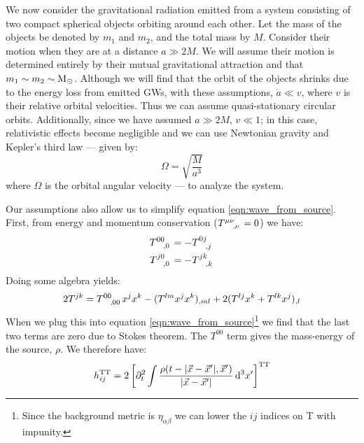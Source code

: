 We now consider the gravitational radiation emitted from a system consisting of two compact spherical objects orbiting around each other. Let the mass of the objects be denoted by $m_1$ and $m_2$, and the total mass by $M$. Consider their motion when they are at a distance $a \gg 2M$. We will assume their motion is determined entirely by their mutual gravitational attraction and that $m_1 \sim m_2 \sim \mathrm{M_\odot}$. Although we will find that the orbit of the objects shrinks due to the energy loss from emitted \acp{GW}, with these assumptions, $\dot{a} \ll v$, where $v$ is their relative orbital velocities. Thus we can assume quasi-stationary circular orbits. Additionally, since we have assumed $a \gg 2M$, $v \ll 1$; in this case, relativistic effects become negligible and we can use Newtonian gravity and Kepler's third law --- given by: 
\begin{equation}
\label{eqn:orbit_ang_v}
\Omega = \sqrt{\frac{M}{a^3}}
\end{equation}
where $\Omega$ is the orbital angular velocity --- to analyze the system.

Our assumptions also allow us to simplify equation \ref{eqn:wave_from_source}. First, from energy and momentum conservation ($T\indices{^{\mu\nu}_{,\nu}} = 0$) we have:
\begin{align*}
T\indices{^{00}_{,0}} &= -T\indices{^{0j}_{,j}} \\
T\indices{^{j0}_{,0}} &= -T\indices{^{jk}_{,k}}
\end{align*}
Doing some algebra yields:
\begin{equation*}
2T^{jk} = T\indices{^{00}_{,00}}x^jx^k - (T^{lm}x^jx^k)_{,ml} + 2(T^{lj}x^k + T^{lk}x^j)_{,l}
\end{equation*}
When we plug this into equation \ref{eqn:wave_from_source}\footnote{Since the background metric is $\eta_{\alpha\beta}$ we can lower the $ij$ indices on T with impunity.} we find that the last two terms are zero due to Stokes theorem. The $T^{00}$ term gives the mass-energy of the source, $\rho$. We therefore have:
\begin{equation}
\label{eqn:source_rho}
h^\TT_{ij} = 2 \left[ \partial_t^2 \int \frac{\rho(t - |\vec{x}-\vec{x}'|, \vec{x}')}{|\vec{x} - \vec{x}'|} \d^3x'\right]^\TT
\end{equation}

